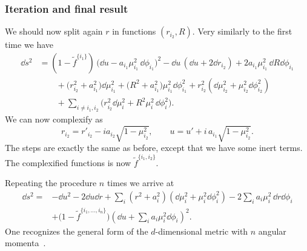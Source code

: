\subsubsection{Iteration and final result}


We should now split again $r$ in functions $(r_{i_2}, R)$.
Very similarly to the first time we have
\begin{equation}
\begin{aligned}
	\dd s^2 &= (1 - \tilde f^{\{i_1\}})\, \Big(\dd u - a_{i_1} \mu_{i_1}^2\, \dd \phi_{i_1} \Big)^2
		- \dd u\, (\dd u + 2 \dd r_{i_2})
		+ 2 a_{i_1} \mu_{i_1}^2\, \dd R \dd \phi_{i_1} \\
		&\qquad+ \big( r_{i_2}^2 + a_{i_1}^2 \big) \dd\mu_{i_1}^2
		+ \big( R^2 + a_{i_1}^2 \big) \mu_{i_1}^2 \dd\phi_{i_1}^2
		+ r_{i_2}^2 ( \dd\mu_{i_2}^2 + \mu_{i_2}^2 \dd\phi_{i_2}^2 ) \\
		&\qquad+ \sum_{i \neq i_1, i_2} \Big(r_{i_2}^2 \dd \mu_i^2 + R^2 \mu_i^2\, \dd \phi_i^2 \Big).
\end{aligned}
\end{equation}
We can now complexify as
\begin{equation}
	r_{i_2} = r'_{i_2} - i a_{i_2} \sqrt{1 - \mu_{i_2}^2}, \qquad
	u = u' + i\, a_{i_1} \sqrt{1 - \mu_{i_2}^2}.
\end{equation} 
The steps are exactly the same as before, except that we have some inert terms.
The complexified functions is now $\tilde f^{\{i_1, i_2\}}$.

Repeating the procedure $n$ times we arrive at
\begin{equation}
	\label{higher-jna:metric:rotating:result-jna-ur}
	\begin{aligned}
		\dd s^2 = &- \dd u^2 - 2 \dd u \dd r
			+ \sum_i (r^2 + a_i^2) (\dd \mu_i^2 + \mu_i^2 \dd \phi_i^2)
			- 2 \sum_i a_i \mu_i^2 \, \dd r \dd \phi_i \\
			&+ \Big(1 - \tilde f^{\{i_1, \ldots, i_n\}} \Big) \left(\dd u + \sum_i a_i \mu_i^2 \dd \phi_i \right)^2.
	\end{aligned}
\end{equation} 
One recognizes the general form of the $d$-dimensional metric with $n$ angular momenta~\cite{Myers:1986:BlackHolesHigher}.


